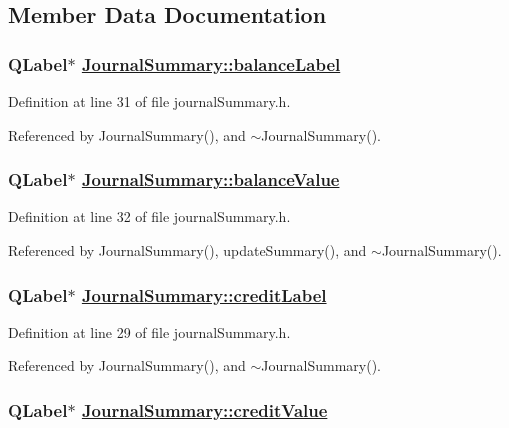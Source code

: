 \subsection{Member Data Documentation}
\hypertarget{classJournalSummary_r6}{
\subsubsection[balanceLabel]{\setlength{\rightskip}{0pt plus 5cm}QLabel$\ast$ \hyperlink{classJournalSummary_r6}{Journal\-Summary::balance\-Label}}}
\label{classJournalSummary_r6}


Definition at line 31 of file journal\-Summary.h.

Referenced by Journal\-Summary(), and $\sim$Journal\-Summary().\hypertarget{classJournalSummary_r7}{
\subsubsection[balanceValue]{\setlength{\rightskip}{0pt plus 5cm}QLabel$\ast$ \hyperlink{classJournalSummary_r7}{Journal\-Summary::balance\-Value}}}
\label{classJournalSummary_r7}


Definition at line 32 of file journal\-Summary.h.

Referenced by Journal\-Summary(), update\-Summary(), and $\sim$Journal\-Summary().\hypertarget{classJournalSummary_r4}{
\subsubsection[creditLabel]{\setlength{\rightskip}{0pt plus 5cm}QLabel$\ast$ \hyperlink{classJournalSummary_r4}{Journal\-Summary::credit\-Label}}}
\label{classJournalSummary_r4}


Definition at line 29 of file journal\-Summary.h.

Referenced by Journal\-Summary(), and $\sim$Journal\-Summary().\hypertarget{classJournalSummary_r5}{
\subsubsection[creditValue]{\setlength{\rightskip}{0pt plus 5cm}QLabel$\ast$ \hyperlink{classJournalSummary_r5}{Journal\-Summary::credit\-Value}}}
\label{classJournalSummary_r5}


